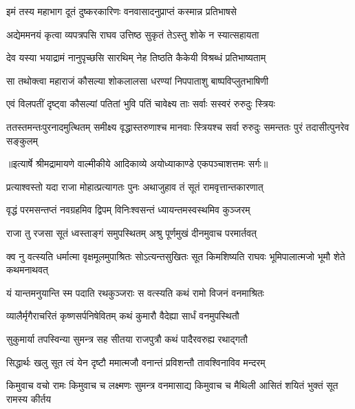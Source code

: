 \twolineshloka
{इमं तस्य महाभाग दूतं दुष्करकारिणः}
{वनवासादनुप्राप्तं कस्मान्न प्रतिभाषसे} %

\twolineshloka
{अद्येममनयं कृत्वा व्यपत्रपसि राघव}
{उत्तिष्ठ सुकृतं तेऽस्तु शोके न स्यात्सहायता} %

\twolineshloka
{देव यस्या भयाद्रामं नानुपृच्छसि सारथिम्}
{नेह तिष्ठति कैकेयी विश्रब्धं प्रतिभाष्यताम्} %

\twolineshloka
{सा तथोक्त्वा महाराजं कौसल्या शोकलालसा}
{धरण्यां निपपाताशु बाष्पविप्लुतभाषिणी} %

\twolineshloka
{एवं विलपतीं दृष्ट्वा कौसल्यां पतितां भुवि}
{पतिं चावेक्ष्य ताः सर्वाः सस्वरं रुरुदुः स्त्रियः} %

\fourlineindentedshloka
{ततस्तमन्तःपुरनादमुत्थितम्}
{समीक्ष्य वृद्धास्तरुणाश्च मानवाः}
{स्त्रियश्च सर्वा रुरुदुः समन्ततः}
{पुरं तदासीत्पुनरेव सङ्कुलम्} %


{॥इत्यार्षे श्रीमद्रामायणे वाल्मीकीये आदिकाव्ये अयोध्याकाण्डे एकपञ्चाशत्तमः सर्गः॥}


\twolineshloka
{प्रत्याश्वस्तो यदा राजा मोहात्प्रत्यागतः पुनः}
{अथाजुहाव तं सूतं रामवृत्तान्तकारणात्} %

\twolineshloka
{वृद्धं परमसन्तप्तं नवग्रहमिव द्विपम्}
{विनिःश्वसन्तं ध्यायन्तमस्वस्थमिव कुञ्जरम्} %

\twolineshloka
{राजा तु रजसा सूतं ध्वस्ताङ्गं समुपस्थितम्}
{अश्रु पूर्णमुखं दीनमुवाच परमार्तवत्} %

\threelineshloka
{क्व नु वत्स्यति धर्मात्मा वृक्षमूलमुपाश्रितः}
{सोऽत्यन्तसुखितः सूत किमशिष्यति राघवः}
{भूमिपालात्मजो भूमौ शेते कथमनाथवत्} %

\twolineshloka
{यं यान्तमनुयान्ति स्म पदाति रथकुञ्जराः}
{स वत्स्यति कथं रामो विजनं वनमाश्रितः} %

\twolineshloka
{व्यालैर्मृगैराचरितं कृष्णसर्पनिषेवितम्}
{कथं कुमारौ वैदेह्या सार्धं वनमुपस्थितौ} %

\twolineshloka
{सुकुमार्या तपस्विन्या सुमन्त्र सह सीतया}
{राजपुत्रौ कथं पादैरवरुह्य रथाद्गतौ} %

\twolineshloka
{सिद्धार्थः खलु सूत त्वं येन दृष्टौ ममात्मजौ}
{वनान्तं प्रविशन्तौ तावश्विनाविव मन्दरम्} %

\threelineshloka
{किमुवाच वचो रामः किमुवाच च लक्ष्मणः}
{सुमन्त्र वनमासाद्य किमुवाच च मैथिली}
{आसितं शयितं भुक्तं सूत रामस्य कीर्तय} %

